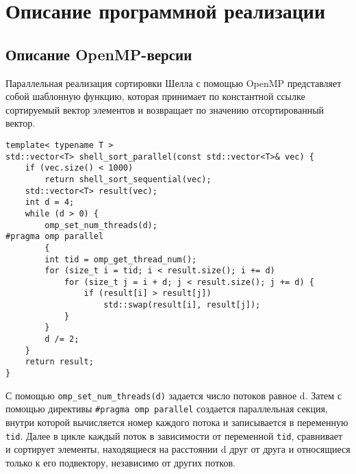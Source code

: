 \documentclass{report}
\begin{document}
\newpage

\section*{Описание программной реализации}
\subsection*{Описание OpenMP-версии}

Параллельная реализация сортировки Шелла с помощью OpenMP представляет собой шаблонную функцию, которая принимает по константной ссылке сортируемый вектор элементов и возвращает по значению отсортированный вектор.
\begin{lstlisting}
template< typename T >
std::vector<T> shell_sort_parallel(const std::vector<T>& vec) {
    if (vec.size() < 1000)
        return shell_sort_sequential(vec);
    std::vector<T> result(vec);
    int d = 4;
    while (d > 0) {
        omp_set_num_threads(d);
#pragma omp parallel
        {
        int tid = omp_get_thread_num();
        for (size_t i = tid; i < result.size(); i += d)
            for (size_t j = i + d; j < result.size(); j += d) {
                if (result[i] > result[j])
                    std::swap(result[i], result[j]);
            }
        }
        d /= 2;
    }
    return result;
}
\end{lstlisting}
С помощью \verb|omp_set_num_threads(d)| задается число потоков равное d. Затем с помощью директивы \verb|#pragma omp parallel| создается параллельная секция, внутри которой вычисляется номер каждого потока и записывается в переменную \verb|tid|. Далее в цикле каждый поток в зависимости от переменной \verb|tid|, сравнивает и сортирует элементы, находящиеся на расстоянии d друг от друга и относящиеся только к его подвектору, независимо от других потков.
\end{document}
